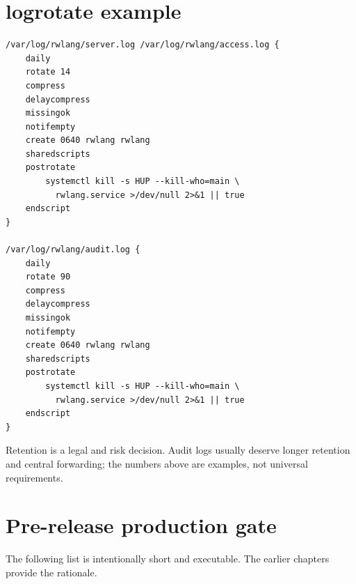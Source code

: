 \section{logrotate example}

\begin{lstlisting}
/var/log/rwlang/server.log /var/log/rwlang/access.log {
    daily
    rotate 14
    compress
    delaycompress
    missingok
    notifempty
    create 0640 rwlang rwlang
    sharedscripts
    postrotate
        systemctl kill -s HUP --kill-who=main \
          rwlang.service >/dev/null 2>&1 || true
    endscript
}

/var/log/rwlang/audit.log {
    daily
    rotate 90
    compress
    delaycompress
    missingok
    notifempty
    create 0640 rwlang rwlang
    sharedscripts
    postrotate
        systemctl kill -s HUP --kill-who=main \
          rwlang.service >/dev/null 2>&1 || true
    endscript
}
\end{lstlisting}

Retention is a legal and risk decision. Audit logs usually deserve longer retention and central forwarding; the numbers above are examples, not universal requirements.

\section{Pre-release production gate}

The following list is intentionally short and executable. The earlier chapters provide the rationale.

